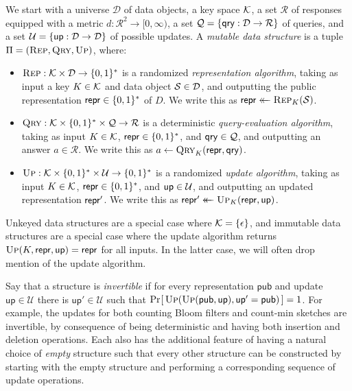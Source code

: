 We start with a universe $\mathcal{D}$ of data objects, a key space $\mathcal{K}$, a set $\mathcal{R}$ of responses equipped with a metric $d: \mathcal{R}^2 \to [0,\infty)$, a set $\mathcal{Q} = \{\mathsf{qry}: \mathcal{D} \to \mathcal{R}\}$ of queries, and a set $\mathcal{U} = \{\mathsf{up}: \mathcal{D} \to \mathcal{D}\}$ of possible updates. A {\em mutable data structure} is a tuple $\Pi = (\textsc{Rep},\textsc{Qry},\textsc{Up})$, where:

\begin{itemize}
  \item $\textsc{Rep}: \mathcal{K} \times \mathcal{D} \to \{0,1\}^*$ is a randomized {\em representation algorithm}, taking as input a key $K \in \mathcal{K}$ and data object $\mathcal{S} \in \mathcal{D}$, and outputting the public representation $\mathsf{repr} \in \{0,1\}^*$ of $D$. We write this as $\mathsf{repr} \mathrel{\leftarrow\mkern-14mu\leftarrow} \textsc{Rep}_K(\mathcal{S})$.
  \item $\textsc{Qry}: \mathcal{K} \times \{0,1\}^* \times \mathcal{Q} \to \mathcal{R}$ is a deterministic {\em query-evaluation algorithm}, taking as input $K \in \mathcal{K}$, $\mathsf{repr} \in \{0,1\}^*$, and $\mathsf{qry} \in \mathcal{Q}$, and outputting an answer $a \in \mathcal{R}$. We write this as $a \gets \textsc{Qry}_K(\mathsf{repr},\mathsf{qry})$.
  \item $\textsc{Up}: \mathcal{K} \times \{0,1\}^* \times \mathcal{U} \to \{0,1\}^*$ is a randomized {\em update algorithm}, taking as input $K \in \mathcal{K}$, $\mathsf{repr} \in \{0,1\}^*$, and $\mathsf{up} \in \mathcal{U}$, and outputting an updated representation $\mathsf{repr}'$. We write this as $\mathsf{repr}' \mathrel{\leftarrow\mkern-14mu\leftarrow} \textsc{Up}_K(\mathsf{repr},\mathsf{up})$.
\end{itemize}

Unkeyed data structures are a special case where $\mathcal{K} = \{\epsilon\}$, and immutable data structures are a special case where the update algorithm returns $\textsc{Up}(K,\mathsf{repr},\mathsf{up})=\mathsf{repr}$ for all inputs.  In the latter case, we will often drop mention of the update algorithm.


Say that a structure is {\em invertible} if for every representation $\mathsf{pub}$ and update $\mathsf{up} \in \mathcal{U}$ there is $\mathsf{up}' \in \mathcal{U}$ such that $\Pr\hspace{-1pt}\left[\,\textsc{Up}(\textsc{Up}(\mathsf{pub},\mathsf{up}),\mathsf{up}' = \mathsf{pub})\,\right] = 1$.  For example, the updates for both counting Bloom filters and count-min sketches are invertible, by consequence of being deterministic and having both insertion and deletion operations. Each also has the additional feature of having a natural choice of {\em empty} structure such that every other structure can be constructed by starting with the empty structure and performing a corresponding sequence of update operations.

 